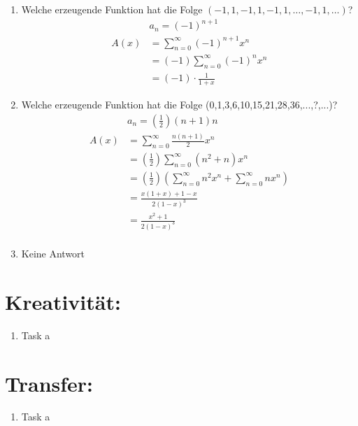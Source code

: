 \begin{enumerate}[label=(\alph*)]
        \item Welche erzeugende Funktion hat die Folge $(-1, 1, -1, 1, -1, 1, \ldots , -1, 1, \ldots )$?\\
        \begin{align*}
        &a_n = (-1)^{n+1}  \\
        A(x)&=\sum_{n=0}^{\infty} (-1)^{n+1} x^n \\
            &=(-1)\sum_{n=0}^{\infty} (-1)^n x^n \\
            &=(-1)\cdot \frac{1}{1+x}
        \end{align*}
        \item Welche erzeugende Funktion hat die Folge (0,1,3,6,10,15,21,28,36,...,?,...)?
		\begin{align*}
        	&a_n = (\frac{1}{2} )(n+1)n  \\
        	A(x)&=\sum_{n=0}^{\infty} \frac{n(n+1)}{2} x^n \\
            	&=(\frac{1}{2})\sum_{n=0}^{\infty} (n^2+n) x^n \\
            	&=(\frac{1}{2})(\sum_{n=0}^{\infty} n^2 x^n  + \sum_{n=0}^{\infty} n x^n)\\
            	&=\frac{x(1+x) + 1 -x }{2(1-x)^3} \\
            	&=\frac{x^2 + 1}{2(1-x)^3} \\
        \end{align*}
        \item Keine Antwort
    \end{enumerate}
    \section*{Kreativität:}
    \begin{enumerate}[label=(\alph*)]
        \item Task a
    \end{enumerate}
    \section*{Transfer:}
    \begin{enumerate}[label=(\alph*)]
        \item Task a
    \end{enumerate}







